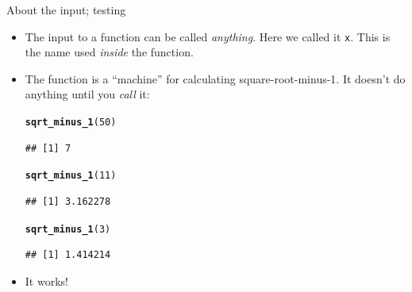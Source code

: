 \documentclass[unknownkeysallowed]{beamer}\usepackage[]{graphicx}\usepackage[]{color}
\makeatletter
\newcommand{\hlnum}[1]{\textcolor[rgb]{0.686,0.059,0.569}{#1}}%
\newcommand{\hlstd}[1]{\textcolor[rgb]{0.345,0.345,0.345}{#1}}%
\newcommand{\hlkwd}[1]{\textcolor[rgb]{0.737,0.353,0.396}{\textbf{#1}}}%
\newenvironment{kframe}{%
 \def\at@end@of@kframe{}%
 \ifinner\ifhmode%
  \def\at@end@of@kframe{\end{minipage}}%
  \begin{minipage}{\columnwidth}%
 \fi\fi%
 \def\FrameCommand##1{\hskip\@totalleftmargin \hskip-\fboxsep
 \colorbox{shadecolor}{##1}\hskip-\fboxsep
     \hskip-\linewidth \hskip-\@totalleftmargin \hskip\columnwidth}%
 \MakeFramed {\advance\hsize-\width
   \@totalleftmargin\z@ \linewidth\hsize
   \@setminipage}}%
 {\par\unskip\endMakeFramed%
 \at@end@of@kframe}
\newenvironment{knitrout}{}{} %
\makeatother
\begin{document}
\begin{frame}[fragile]{About the input; testing}
  
  \begin{itemize}
  \item The input to a function can be called \emph{anything}. Here we
    called it \texttt{x}. This is the name used \emph{inside} the
    function.
  \item The function is a ``machine'' for calculating
    square-root-minus-1. It doesn't do anything until you \emph{call} it:
    
\begin{knitrout}
\color{fgcolor}\begin{kframe}
\begin{alltt}
\hlkwd{sqrt_minus_1}\hlstd{(}\hlnum{50}\hlstd{)}
\end{alltt}
\begin{verbatim}
## [1] 7
\end{verbatim}
\begin{alltt}
\hlkwd{sqrt_minus_1}\hlstd{(}\hlnum{11}\hlstd{)}
\end{alltt}
\begin{verbatim}
## [1] 3.162278
\end{verbatim}
\begin{alltt}
\hlkwd{sqrt_minus_1}\hlstd{(}\hlnum{3}\hlstd{)}
\end{alltt}
\begin{verbatim}
## [1] 1.414214
\end{verbatim}
\end{kframe}
\end{knitrout}
\item It works!
  \end{itemize}
  
\end{frame}
\end{document}
